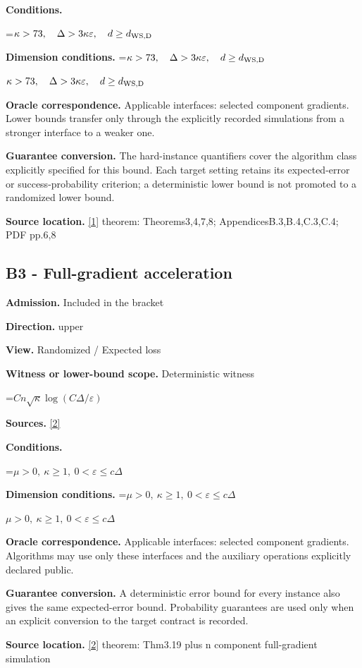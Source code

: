 \documentclass[10pt,a4paper]{article}
\newcommand{\AtlasMath}[1]{\par\begingroup\centering\setbox0=\hbox{$\displaystyle #1$}\ifdim\wd0>1.4\linewidth\typeout{ATLAS WIDE FORMULA: \the\wd0}\fi\ifdim\wd0>\linewidth\resizebox{\linewidth}{!}{\box0}\else\box0\fi\par\endgroup}
\newcommand{\AtlasInlineMath}[1]{\begingroup\setbox0=\hbox{$#1$}\ifdim\wd0>.4\linewidth\endgroup\AtlasMath{#1}\else\endgroup$#1$\fi}
\begin{document}
\textbf{Conditions.} 
\AtlasMath{\kappa>73,\quad\Delta>3\kappa\varepsilon,\quad d\ge d_{\rm WS,D}}


\textbf{Dimension conditions.} \AtlasInlineMath{\kappa>73,\quad\Delta>3\kappa\varepsilon,\quad d\ge d_{\rm WS,D}}

\textbf{Oracle correspondence.} Applicable interfaces: selected component gradients. Lower bounds transfer only through the explicitly recorded simulations from a stronger interface to a weaker one.

\textbf{Guarantee conversion.} The hard-instance quantifiers cover the algorithm class explicitly specified for this bound. Each target setting retains its expected-error or success-probability criterion; a deterministic lower bound is not promoted to a randomized lower bound.

\textbf{Source location.} \href{https://arxiv.org/pdf/1605.08003v3}{[1]} theorem: Theorems3,4,7,8; AppendicesB.3,B.4,C.3,C.4; PDF pp.6,8

\subsection{B3 - Full-gradient acceleration}
\textbf{Admission.} Included in the bracket

\textbf{Direction.} upper

\textbf{View.} Randomized / Expected loss

\textbf{Witness or lower-bound scope.} Deterministic witness

\AtlasMath{Cn\sqrt\kappa\log(C\Delta/\varepsilon)}
\textbf{Sources.} \href{https://arxiv.org/pdf/1405.4980}{[2]}

\textbf{Conditions.} 
\AtlasMath{\mu>0,\ \kappa\ge1,\ 0<\varepsilon\le c\Delta}


\textbf{Dimension conditions.} \AtlasInlineMath{\mu>0,\ \kappa\ge1,\ 0<\varepsilon\le c\Delta}

\textbf{Oracle correspondence.} Applicable interfaces: selected component gradients. Algorithms may use only these interfaces and the auxiliary operations explicitly declared public.

\textbf{Guarantee conversion.} A deterministic error bound for every instance also gives the same expected-error bound. Probability guarantees are used only when an explicit conversion to the target contract is recorded.

\textbf{Source location.} \href{https://arxiv.org/pdf/1405.4980}{[2]} theorem: Thm3.19 plus n component full-gradient simulation
\end{document}
